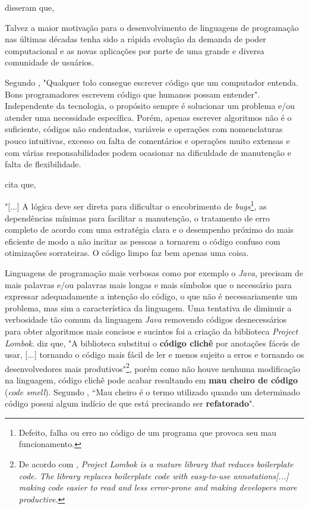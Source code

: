   disseram que, \begin{citacao}Talvez a maior motivação para o desenvolvimento de linguagens de programação nas últimas décadas tenha sido a rápida evolução da demanda de poder computacional e as novas aplicações por parte de uma grande e diversa comunidade de usuários. \end{citacao}
 
 Segundo , "Qualquer tolo consegue escrever código que um computador entenda. Bons programadores escrevem código que humanos possam entender". Independente da tecnologia, o propósito sempre é solucionar um problema e/ou atender uma necessidade específica.
 Porém, apenas escrever algoritmos
 não é o suficiente, códigos não endentados, variáveis e operações com nomenclaturas pouco intuitivas, excesso ou falta de comentários e operações muito extensas e com várias responsabilidades podem ocasionar na dificuldade de manutenção e falta de flexibilidade.
 
  cita que, \begin{citacao}"[...] A lógica deve ser direta para dificultar o encobrimento de \textit{bugs}\footnote{Defeito, falha ou erro no código de um programa que provoca seu mau funcionamento.}, as dependências mínimas para facilitar a manutenção, o tratamento de erro completo de acordo com uma estratégia clara e o desempenho próximo do mais eficiente de modo a não incitar as pessoas a tornarem o código confuso com otimizações sorrateiras. O código limpo faz bem apenas uma coisa. \end{citacao}
 
 Linguagens de programação mais verbosas como por exemplo o \textit{Java}, precisam de mais palavras e/ou palavras mais longas e mais símbolos que o necessário para expressar adequadamente a intenção do código, o que não é necessariamente um problema, mas sim a característica da linguagem. Uma tentativa de diminuir a verbosidade tão comum da linguagem \textit{Java} removendo códigos desnecessários para obter algoritmos mais concisos e sucintos foi a criação da biblioteca \textit{Project Lombok}.  diz que, "A biblioteca substitui o \textbf{código clichê} por anotações fáceis de usar, [...] tornando o código mais fácil de ler e menos sujeito a erros e tornando os desenvolvedores mais produtivos"\footnote{De acordo com , \textit{Project Lombok is a mature library that reduces boilerplate code. The library replaces boilerplate code with easy-to-use annotations[...] making code easier to read and less error-prone and making developers more productive}.}, porém como não houve nenhuma modificação na linguagem, código clichê pode acabar resultando em \textbf{mau cheiro de código} (\textit{code smell}). Segundo , “Mau cheiro é o termo utilizado quando um determinado código possui algum indício de que está precisando ser \textbf{refatorado}".

